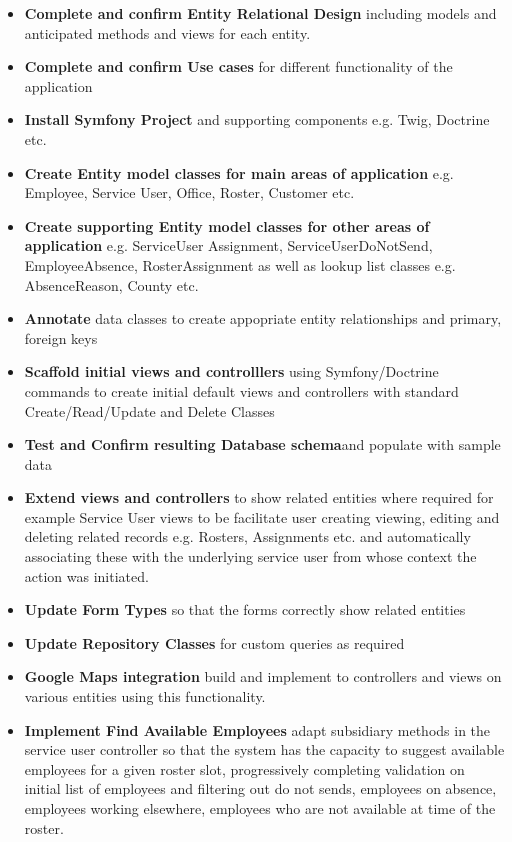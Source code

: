 \documentclass[a4paper,Times New Roman 11pt]{article}
\begin{document}
\begin {itemize}
\item  \textbf{Complete and confirm Entity Relational Design} including models and anticipated methods and views for each entity.
 \item  \textbf{Complete and confirm Use cases } for different functionality of the application
\item  \textbf{Install Symfony Project} and supporting components e.g. Twig, Doctrine etc.
\item  \textbf{Create Entity model classes for main areas of application} e.g. Employee, Service User, Office, Roster, Customer etc.
\item  \textbf{Create supporting Entity model classes for other areas of application} e.g. ServiceUser Assignment, 
ServiceUserDoNotSend, EmployeeAbsence, RosterAssignment as well as lookup list classes e.g. AbsenceReason, County etc. 
\item  \textbf{Annotate} data classes to create appopriate entity relationships and primary, foreign keys 
\item  \textbf{Scaffold initial views and controlllers} using Symfony/Doctrine commands to create initial default views and controllers with standard Create/Read/Update and Delete Classes
\item  \textbf{Test and Confirm resulting Database schema}and populate with sample data
\item  \textbf{Extend views and controllers }to show related entities where required for example Service User views to be facilitate user creating viewing, editing and deleting related records e.g. Rosters, Assignments etc. and automatically associating these with the underlying service user from whose context the action was initiated.
\item  \textbf{Update Form Types} so that the forms correctly show related entities
\item  \textbf{Update Repository Classes} for custom queries as required
\item  \textbf{Google Maps integration} build and implement to controllers and views on various entities using this functionality.
\item  \textbf{Implement Find Available Employees} adapt subsidiary methods in the service user controller so that the system has the capacity to suggest available employees for a given roster slot, progressively completing validation on initial list of employees and filtering out do not sends, employees on absence, employees working elsewhere, employees who are not available at time of the roster.

\end{itemize}
\end{document}
